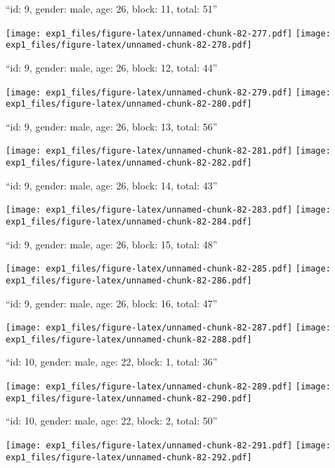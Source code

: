 \documentclass[11pt,,]{article}
\begin{document}
\newpage
[1] 

``id: 9, gender: male, age: 26, block: 11, total: 51''

\texttt{[image: exp1\_files/figure-latex/unnamed-chunk-82-277.pdf]}
\texttt{[image: exp1\_files/figure-latex/unnamed-chunk-82-278.pdf]}

\newpage
[1] 

``id: 9, gender: male, age: 26, block: 12, total: 44''

\texttt{[image: exp1\_files/figure-latex/unnamed-chunk-82-279.pdf]}
\texttt{[image: exp1\_files/figure-latex/unnamed-chunk-82-280.pdf]}

\newpage
[1] 

``id: 9, gender: male, age: 26, block: 13, total: 56''

\texttt{[image: exp1\_files/figure-latex/unnamed-chunk-82-281.pdf]}
\texttt{[image: exp1\_files/figure-latex/unnamed-chunk-82-282.pdf]}

\newpage
[1] 

``id: 9, gender: male, age: 26, block: 14, total: 43''

\texttt{[image: exp1\_files/figure-latex/unnamed-chunk-82-283.pdf]}
\texttt{[image: exp1\_files/figure-latex/unnamed-chunk-82-284.pdf]}

\newpage
[1] 

``id: 9, gender: male, age: 26, block: 15, total: 48''

\texttt{[image: exp1\_files/figure-latex/unnamed-chunk-82-285.pdf]}
\texttt{[image: exp1\_files/figure-latex/unnamed-chunk-82-286.pdf]}

\newpage
[1] 

``id: 9, gender: male, age: 26, block: 16, total: 47''

\texttt{[image: exp1\_files/figure-latex/unnamed-chunk-82-287.pdf]}
\texttt{[image: exp1\_files/figure-latex/unnamed-chunk-82-288.pdf]}

\newpage
[1] 

``id: 10, gender: male, age: 22, block: 1, total: 36''

\texttt{[image: exp1\_files/figure-latex/unnamed-chunk-82-289.pdf]}
\texttt{[image: exp1\_files/figure-latex/unnamed-chunk-82-290.pdf]}

\newpage
[1] 

``id: 10, gender: male, age: 22, block: 2, total: 50''

\texttt{[image: exp1\_files/figure-latex/unnamed-chunk-82-291.pdf]}
\texttt{[image: exp1\_files/figure-latex/unnamed-chunk-82-292.pdf]}
\end{document}
